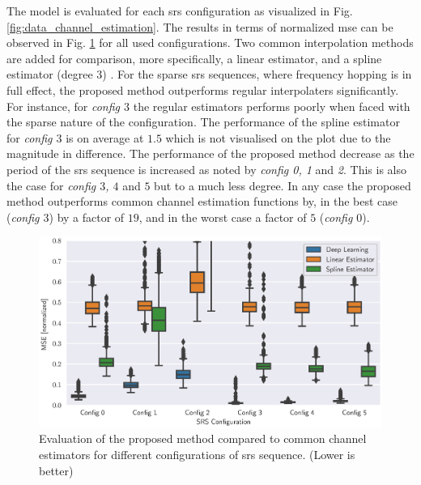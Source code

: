 The model is evaluated for each \gls{srs} configuration as visualized in Fig. \ref{fig:data_channel_estimation}. The results in terms of normalized \gls{mse} can be observed in Fig. \ref{fig:srs_configuration_error_boxplot} for all used configurations. Two common interpolation methods are added for comparison, more specifically, a linear estimator, and a spline estimator (degree $3$) \cite{2020SciPy-NMeth}.  For the sparse \gls{srs} sequences, where frequency hopping is in full effect, the proposed method outperforms regular interpolaters significantly. For instance, for \emph{config $3$} the regular estimators performs poorly when faced with the sparse nature of the configuration. The performance of the spline estimator for \emph{config $3$} is on average at $1.5$ which is not visualised on the plot due to the magnitude in difference. The performance of the proposed method decrease as the period of the \gls{srs} sequence is increased as noted by \emph{config 0, 1} and \emph{2}. This is also the case for \emph{config $3$, $4$} and $5$ but to a much less degree. In any case the proposed method outperforms common channel estimation functions by, in the best case (\emph{config $3$}) by a factor of $19$, and in the worst case a factor of $5$ (\emph{config $0$}).
\begin{figure}
    \centering
    \includegraphics{chapters/part_uplink/figures/results/channel_estimation/srs_configuration_error_boxplot.eps}
    \caption{Evaluation of the proposed method compared to common channel estimators for different configurations of \gls{srs} sequence. (Lower is better)}
    \label{fig:srs_configuration_error_boxplot}
\end{figure}

